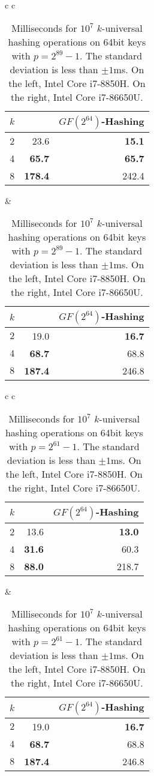 \begin{table}[H]
   \centering
   \begin{tabular}{c c}
      \begin{tabular}{r | r r}
         $k$ & \Cref{alg:Mersenne}       & $GF(2^{64})$-Hashing \\
         \hline
         2 & 23.6 & \textbf{15.1} \\
         4 & \textbf{65.7} & \textbf{65.7} \\
         8 & \textbf{178.4} & 242.4 \\
      \end{tabular}
      \hspace{.5em}
      &
      \hspace{.5em}
      \begin{tabular}{r | r r}
         $k$ & \Cref{alg:Mersenne}       & $GF(2^{64})$-Hashing \\
         \hline
         $2$ & 19.0           & \textbf{16.7} \\
         $4$ & \textbf{68.7}  & 68.8 \\
         $8$ & \textbf{187.4} & 246.8
      \end{tabular}
   \end{tabular}
   \caption{Milliseconds for $10^7$ $k$-universal hashing operations on 64bit keys with $p=2^{89}-1$.
      The standard deviation is less than $\pm1$ms.
         On the left, Intel Core i7-8850H.
         On the right, Intel Core i7-86650U.
   }
   \label{tab:hashing-experiments}
\end{table}

\begin{table}[H]
   \centering
   \begin{tabular}{c c}
      \begin{tabular}{r | r r}
         $k$ & \Cref{alg:Mersenne}       & $GF(2^{64})$-Hashing \\
         \hline
         2& 13.6 & \textbf{13.0} \\
         4& \textbf{31.6} & 60.3 \\
         8&\textbf{88.0} & 218.7
      \end{tabular}
      \hspace{.5em}
      &
      \hspace{.5em}
      \begin{tabular}{r | r r}
         $k$ & \Cref{alg:Mersenne}       & $GF(2^{64})$-Hashing \\
         \hline
         $2$ & 19.0           & \textbf{16.7} \\
         $4$ & \textbf{68.7}  & 68.8 \\
         $8$ & \textbf{187.4} & 246.8
      \end{tabular}
   \end{tabular}
   \caption{Milliseconds for $10^7$ $k$-universal hashing operations on 64bit keys with $p=2^{61}-1$.
      The standard deviation is less than $\pm1$ms.
         On the left, Intel Core i7-8850H.
         On the right, Intel Core i7-86650U.
   }
   \label{tab:hashing-experiments2}
\end{table}

